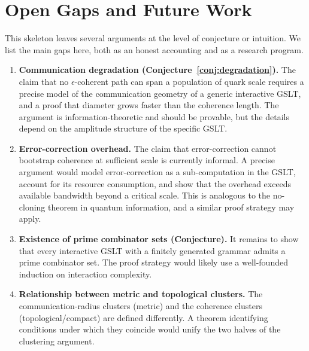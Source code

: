 \chapter{Open Gaps and Future Work}
\label{sec:gaps}

This skeleton leaves several arguments at the level of conjecture
or intuition.
We list the main gaps here, both as an honest accounting and as a
research program.

\begin{enumerate}[label=\textbf{Gap \arabic*.}, leftmargin=*, itemsep=8pt]

  \item \textbf{Communication degradation (Conjecture~\ref{conj:degradation}).}
        The claim that no $\epsilon$-coherent path can span a
        population of quark scale requires a precise model of the
        communication geometry of a generic interactive GSLT, and
        a proof that diameter grows faster than the coherence
        length.
        The argument is information-theoretic and should be
        provable, but the details depend on the amplitude structure
        of the specific GSLT.

  \item \textbf{Error-correction overhead.}
        The claim that error-correction cannot bootstrap coherence
        at sufficient scale is currently informal.
        A precise argument would model error-correction as a
        sub-computation in the GSLT, account for its resource
        consumption, and show that the overhead exceeds available
        bandwidth beyond a critical scale.
        This is analogous to the no-cloning theorem in quantum
        information, and a similar proof strategy may apply.

  \item \textbf{Existence of prime combinator sets (Conjecture).}
        It remains to show that every interactive GSLT with a
        finitely generated grammar admits a prime combinator set.
        The proof strategy would likely use a well-founded
        induction on interaction complexity.

  \item \textbf{Relationship between metric and topological
        clusters.}
        The communication\hspace{0pt}-radius clusters (metric) and the
        coherence clusters (topological/compact) are defined
        differently.
        A theorem identifying conditions under which they coincide
        would unify the two halves of the clustering argument.


\end{enumerate}
